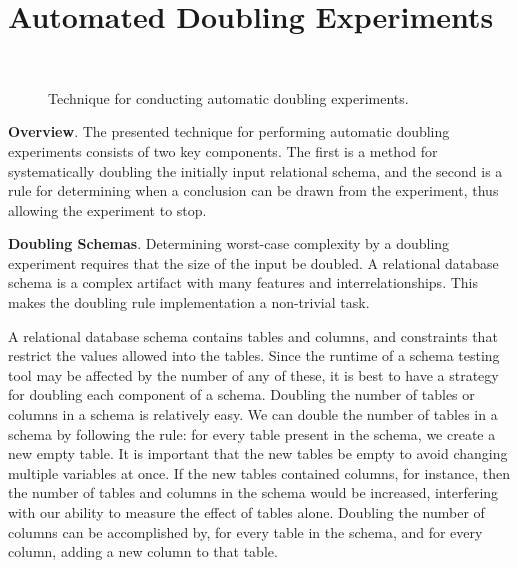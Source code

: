 
\vspace*{-.035in}
\section{Automated Doubling Experiments}\label{sec:technique}
\vspace*{-.035in}

  \begin{figure*}
    
    \vspace*{-.1in}
    \caption{Technique for conducting automatic doubling experiments.}~\label{fig:doublingexp}
    \vspace*{-.1in}
  \end{figure*}


  {\bf Overview}. The presented technique for performing automatic doubling experiments consists of two key components.
  The first is a method for systematically doubling the initially input relational schema, and the second is a rule for
  determining when a conclusion can be drawn from the experiment, thus allowing the experiment to stop.

  \textbf{Doubling Schemas}. Determining worst-case complexity by a doubling experiment requires that the size of the
  input be doubled. A relational database schema is a complex artifact with many features and interrelationships.  This
  makes the doubling rule implementation a non-trivial task.


  A relational database schema contains tables and columns, and constraints that restrict the values allowed into the
  tables. Since the runtime of a schema testing tool may be affected by the number of any of these, it is best to have a
  strategy for doubling each component of a schema. Doubling the number of tables or columns in a schema is relatively
  easy.  We can double the number of tables in a schema by following the rule: for every table present in the schema, we
  create a new empty table. It is important that the new tables be empty to avoid changing multiple variables at once.
  If the new tables contained columns, for instance, then the number of tables and columns in the schema would be
  increased, interfering with our ability to measure the effect of tables alone.  Doubling the number of columns can be
  accomplished by, for every table in the schema, and for every column, adding a new column to that table.

